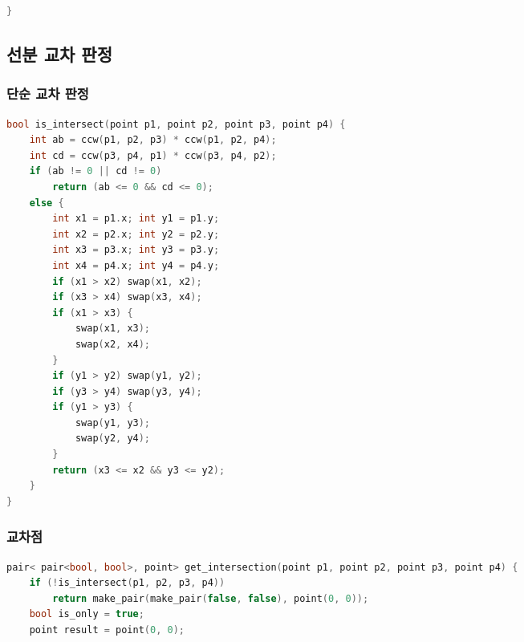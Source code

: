 \documentclass[]{article}
\begin{document}
\begin{multicols*}{2}
\begin{lstlisting}[language=c++]
}
\end{lstlisting}
\columnbreak
\subsection{선분 교차 판정}
\subsubsection{단순 교차 판정}
\begin{lstlisting}[language=c++]
bool is_intersect(point p1, point p2, point p3, point p4) {
    int ab = ccw(p1, p2, p3) * ccw(p1, p2, p4);
    int cd = ccw(p3, p4, p1) * ccw(p3, p4, p2);
    if (ab != 0 || cd != 0)
        return (ab <= 0 && cd <= 0);
    else {
        int x1 = p1.x; int y1 = p1.y; 
        int x2 = p2.x; int y2 = p2.y; 
        int x3 = p3.x; int y3 = p3.y; 
        int x4 = p4.x; int y4 = p4.y; 
        if (x1 > x2) swap(x1, x2);
        if (x3 > x4) swap(x3, x4);
        if (x1 > x3) {
            swap(x1, x3);
            swap(x2, x4);
        }
        if (y1 > y2) swap(y1, y2);
        if (y3 > y4) swap(y3, y4);
        if (y1 > y3) {
            swap(y1, y3);
            swap(y2, y4);
        }
        return (x3 <= x2 && y3 <= y2);
    }
}
\end{lstlisting}
\clearpage
\subsubsection{교차점}
\begin{lstlisting}[language=c++]
pair< pair<bool, bool>, point> get_intersection(point p1, point p2, point p3, point p4) {
    if (!is_intersect(p1, p2, p3, p4))
        return make_pair(make_pair(false, false), point(0, 0));
    bool is_only = true;
    point result = point(0, 0);


\end{lstlisting}
\end{multicols*}
\end{document}
